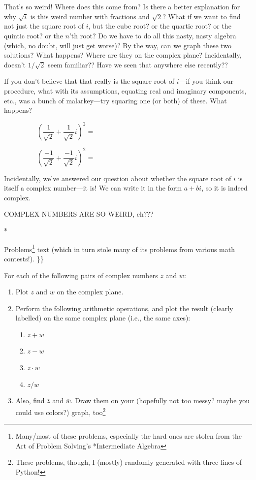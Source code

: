 \documentclass[
]{article}
\begin{document}
That's so weird! Where does this come from? Is there a better
explanation for why \(\sqrt{i}\) is this weird number with fractions and
\(\sqrt{2}\)? What if we want to find not just the square root of \(i\),
but the cube root? or the quartic root? or the quintic root? or the
\(n\)'th root? Do we have to do all this nasty, nasty algebra (which, no
doubt, will just get worse)? By the way, can we graph these two
solutions? What happens? Where are they on the complex plane?
Incidentally, doesn't \(1/\sqrt{2}\) seem familiar?? Have we seen that
anywhere else recently??

If you don't believe that that really is the square root of \(i\)---if
you think our procedure, what with its assumptions, equating real and
imaginary components, etc., was a bunch of malarkey---try squaring one
(or both) of these. What happens?

\[\left(\frac{1}{\sqrt{2}}+\frac{1}{\sqrt{2}}i\right)^2 = \hspace{3in} \]

\[\left(\frac{-1}{\sqrt{2}}+\frac{-1}{\sqrt{2}}i\right)^2 = \hspace{3in}\]

Incidentally, we've answered our question about whether the square root
of \(i\) is itself a complex number---it is! We can write it in the form
\(a+bi\), so it is indeed complex.

COMPLEX NUMBERS ARE SO WEIRD, eh???

\vspace{3pc}

\centerline**

\Large Problems\footnote{Many/most of these problems, especially the hard ones are stolen from the Art of Problem Solving's *Intermediate Algebra}
text (which in turn stole many of its problems from various math
contests!). \}\}

\vspace{1pc}

\noindent For each of the following pairs of complex numbers \(z\) and
\(w\):

\begin{enumerate}[label=\alph*.]
  \setlength{\itemsep}{1pt}
  \setlength{\parskip}{0pt}
  \setlength{\parsep}{0pt}
\item Plot $z$ and $w$ on the complex plane.
\item Perform the following arithmetic operations, and plot the result (clearly labelled) on the same complex plane (i.e., the same axes):
\begin{enumerate}[label=(\roman*)]
\item $z+w$
\item $z-w$
\item $z\cdot w$
\item $z/w$
\end{enumerate}
\item Also, find $\overline{z}$ and $\overline{w}$. Draw them on your (hopefully not too messy? maybe you could use colors?) graph, too\footnote{These problems, though, I (mostly) randomly generated with three lines of Python!}
\end{enumerate}
\end{document}
